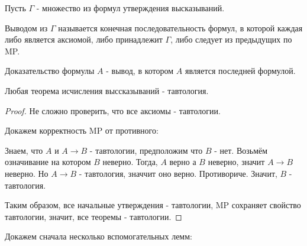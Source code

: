 \begin{definition} \thmslashn 

    Пусть $\Gamma$ - множество из формул утверждения высказываний.

    Выводом из $\Gamma$ называется конечная последовательность формул, в которой каждая либо является аксиомой, либо принадлежит $\Gamma$, либо следует из предыдущих по MP.

\end{definition}

\begin{definition}[Доказательство] \thmslashn 

    Доказательство формулы $A$ - вывод, в котором $A$ является последней формулой.
\end{definition}
\begin{theorem} \thmslashn

    Любая теорема исчисления выссказываний - тавтология.
    \begin{proof} \thmslashn
    
        Не сложно проверить, что все аксиомы - тавтологии.

        Докажем корректность MP от противного:

        Знаем, что $A$ и $A \to B$ - тавтологии, предположим что $B$ - нет. Возьмём означивание на котором $B$ неверно. Тогда, $A$ верно а $B$ неверно, значит $A \to B$ неверно. Но $A \to B$ - тавтология, значчит оно верно. Противориче. Значит, $B$ - тавтология.

        Таким образом, все начальные утверждения - тавтологии, MP сохраняет свойство тавтологии, значит, все теоремы - тавтологии.
    \end{proof}
\end{theorem}

Докажем сначала несколько вспомогательных лемм:

